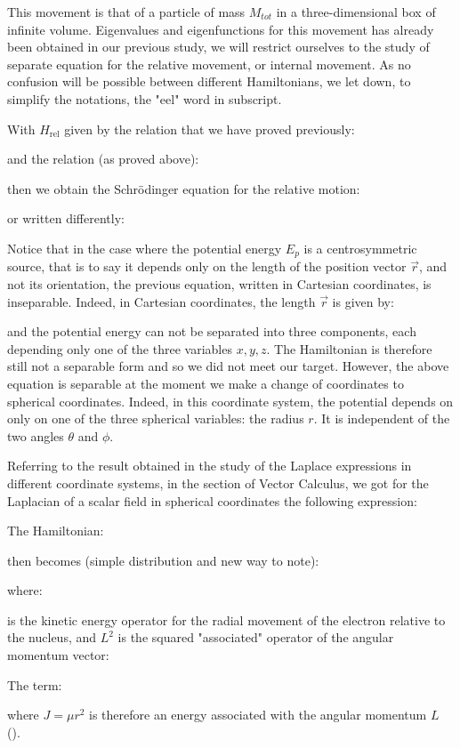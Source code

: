 	This movement is that of a particle of mass $M_{tot}$ in a three-dimensional box of infinite volume. Eigenvalues and eigenfunctions for this movement has already been obtained in our previous study, we will restrict ourselves to the study of separate equation for the relative movement, or internal movement. As no confusion will be possible between different Hamiltonians, we let down, to simplify the notations, the "eel" word in subscript.
	
	With $H_{\text{rel}}$ given by the relation that we have proved previously:
	
	and the relation (as proved above):
	
	then we obtain the Schrödinger equation for the relative motion:
	
	or written differently:
	
	Notice that in the case where the potential energy $E_{p}$ is a centrosymmetric source, that is to say it depends only on the length of the position vector $\vec{r}$, and not its orientation, the previous equation, written in Cartesian coordinates, is inseparable. Indeed, in Cartesian coordinates, the length $\vec{r}$ is given by:
	
	and the potential energy can not be separated into three components, each depending only one of the three variables $x, y, z$. The Hamiltonian is therefore still not a separable form and so we did not meet our target. However, the above equation is separable at the moment we make a change of coordinates to spherical coordinates. Indeed, in this coordinate system, the potential depends on only on one of the three spherical variables: the radius $r$. It is independent of the two angles $\theta$ and $\phi$.
	
	Referring to the result obtained in the study of the Laplace expressions in different coordinate systems, in the section of Vector Calculus, we got for the Laplacian of a scalar field in spherical coordinates the following expression:
	
	The Hamiltonian:
	
	then becomes (simple distribution and new way to note):
	
	where:
	
	is the kinetic energy operator for the radial movement of the electron relative to the nucleus, and $L^2$ is the squared "associated" operator of the angular momentum vector:
	
	The term:
	
	where $J=\mu r^2$ is therefore an energy associated with the angular momentum $L$ ().
	
